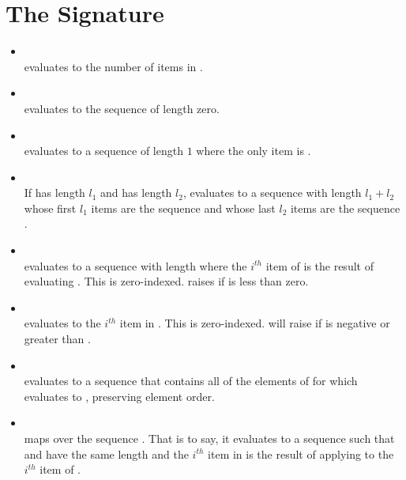 \section{The Signature}
\begin{itemize}
\item {}\\ 
  evaluates to the number of items in .

\item {}\\ 
  evaluates to the sequence of length zero.

\item {}\\ 
  evaluates to a sequence of length $1$ where the only item is .

\item {}\\ If
   has length $l_1$ and  has length $l_2$, 
  evaluates to a sequence with length $l_1 + l_2$ whose first $l_1$ items
  are the sequence  and whose last $l_2$ items are the sequence
  .

\item {}\\  evaluates to a sequence  with
  length  where the $i^{th}$ item of  is the result of
  evaluating . This is zero-indexed.   raises  if
   is less than zero.

\item {}\\ 
  evaluates to the $i^{th}$ item in . This is
  zero-indexed.  will raise  if  is
  negative or greater than .

\item {}\\
   evaluates to a sequence that contains all of the
  elements of  for which  evaluates to ,
  preserving element order.
  
\item {}\\  maps  over the sequence
  . That is to say, it evaluates to a sequence  such that
   and  have the same length and the $i^{th}$ item in
   is the result of applying  to the $i^{th}$ item of
  .


\end{itemize}
